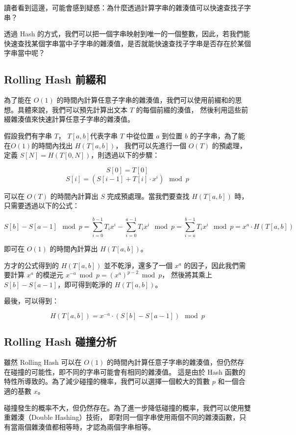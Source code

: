 \documentclass[12pt,a4paper]{article}
\begin{document}
讀者看到這邊，可能會感到疑惑：為什麼透過計算字串的雜湊值可以快速查找子字串？

透過 Hash 的方式，我們可以把一個字串映射到唯一的一個整數，因此，若我們能快速查找某個字串當中子字串的雜湊值，是否就能快速查找子字串是否存在於某個字串當中呢？

\subsection{Rolling Hash 前綴和}

為了能在 $O(1)$ 的時間內計算任意子字串的雜湊值，我們可以使用前綴和的思想。具體來說，我們可以預先計算出文本 $T$ 的每個前綴的湊值，
然後利用這些前綴雜湊值來快速計算任意子字串的雜湊值。

假設我們有字串 $T$， $T[a, b]$代表字串 $T$ 中從位置 $a$ 到位置 $b$ 的子字串，為了能在$O(1)$的時間內找出 $H(T[a, b])$，
我們可以先進行一個 $O(T)$ 的預處理，定義 $S[N] = H(T[0, N])$，則透過以下的步驟：

$$S[0] = T[0]$$
$$S[i] = (S[i-1] + T[i]\cdot x^i) \mod p$$

可以在 $O(T)$ 的時間內計算出 $S$ 完成預處理。當我們要查找 $H(T[a, b])$ 時，只需要透過以下的公式：

$$S[b] - S[a-1] \mod p = \displaystyle\sum_{i=0}^{b-1}T_ix^i - \displaystyle\sum_{i=0}^{a-1}T_ix^i \mod p = \displaystyle\sum_{i=a}^{b-1}T_ix^i \mod p = x^{a}\cdot H(T[a, b])$$

即可在 $O(1)$ 的時間內計算出 $H(T[a, b])$。

方才的公式得到的 $H(T[a, b])$ 並不乾淨，還多了一個 $x^{a}$ 的因子，因此我們需要計算 $x^{a}$ 的模逆元 $x^{-a} \bmod p = (x^a)^{p-2} \bmod p$，
然後將其乘上 $S[b] - S[a-1]$，即可得到乾淨的 $H(T[a, b])$。

最後，可以得到：

$$H(T[a, b]) = x^{-a} \cdot (S[b] - S[a-1]) \mod p$$


\subsection{Rolling Hash 碰撞分析}

雖然 Rolling Hash 可以在 $O(1)$ 的時間內計算任意子字串的雜湊值，但仍然存在碰撞的可能性，即不同的字串可能會有相同的雜湊值。
這是由於 Hash 函數的特性所導致的。為了減少碰撞的機率，我們可以選擇一個較大的質數 $p$ 和一個合適的基數 $x$。

碰撞發生的概率不大，但仍然存在。為了進一步降低碰撞的概率，我們可以使用雙重雜湊（Double Hashing）技術，
即對同一個字串使用兩個不同的雜湊函數，只有當兩個雜湊值都相等時，才認為兩個字串相等。
\end{document}
